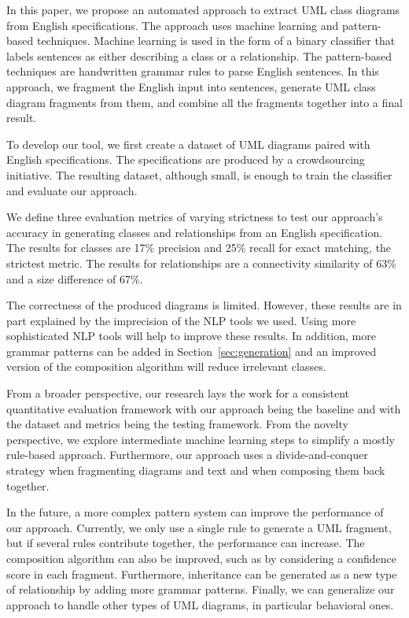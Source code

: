 \documentclass[sigconf]{acmart}
\begin{document}
In this paper, we propose an automated approach to extract UML class diagrams from English specifications. The approach uses machine learning and pattern-based techniques. Machine learning is used in the form of a binary classifier that labels sentences as either describing a class or a relationship. The pattern-based techniques are handwritten grammar rules to parse English sentences. In this approach, we fragment the English input into sentences, generate UML class diagram fragments from them, and combine all the fragments together into a final result.

To develop our tool, we first create a dataset of UML diagrams paired with English specifications. The specifications are produced by a crowdsourcing initiative. The resulting dataset, although small, is enough to train the classifier and evaluate our approach. 

We define three evaluation metrics of varying strictness to test our approach's accuracy in generating classes and relationships from an English specification. The results for classes are 17\% precision and 25\% recall for exact matching, the strictest metric. The results for relationships are a connectivity similarity of 63\% and a size difference of 67\%.

The correctness of the produced diagrams is limited. However, these results are in part explained by the imprecision of the NLP tools we used. Using more sophisticated NLP tools will help to improve these results. In addition, more grammar patterns can be added in Section~\ref{sec:generation} and an improved version of the composition algorithm will reduce irrelevant classes.

From a broader perspective, our research lays the work for a consistent quantitative evaluation framework with our approach being the baseline and with the dataset and metrics being the testing framework. From the novelty perspective, we explore intermediate machine learning steps to simplify a mostly rule-based approach. Furthermore, our approach uses a divide-and-conquer strategy when fragmenting diagrams and text and when composing them back together.

In the future, a more complex pattern system can improve the performance of our approach. Currently, we only use a single rule to generate a UML fragment, but if several rules contribute together, the performance can increase. The composition algorithm can also be improved, such as by considering a confidence score in each fragment. Furthermore, inheritance can be generated as a new type of relationship by adding more grammar patterns. Finally, we can generalize our approach to handle other types of UML diagrams, in particular behavioral ones.



\end{document}
